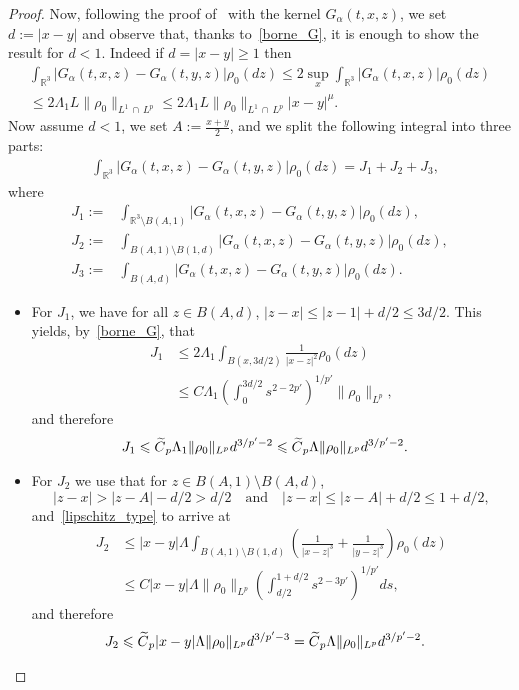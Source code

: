 \documentclass[AHL,Unicode,longabstracts,published]{cedram}
\newcommand{\R}{\mathbb{R}}
\renewcommand{\leq}{\leqslant}
\renewcommand{\geq}{\geqslant}
\let\oldtilde\tilde
\renewcommand*{\tilde}[1]{\mathchoice{\widetilde{#1}}{\widetilde{#1}}{\oldtilde{#1}}{\oldtilde{#1}}}
\begin{document}
\begin{proof}
Now, following the proof of~\cite[Lemma~2]{Miot} with the kernel $G_\alpha(t,x,z)$, we set $d:=|x-y|$ and observe that, thanks to~\eqref{borne_G}, it is enough to show the result for $d<1 $. Indeed if $d=|x-y|\geq 1$ then
\begin{multline}\label{eq:Holder_d>1}
\int_{\R^3} |G_\alpha(t,x,z)-G_\alpha(t,y,z)|\rho_0(dz)\leq 2 \underset{x}{\sup}\int_{\R^3} |G_\alpha(t,x,z)|\rho_0(dz) \\
\leq 2\Lambda_1 L \|\rho_0\|_{L^1\,\cap\,L^p} \leq 2\Lambda_1 L \|\rho_0\|_{L^1\,\cap\,L^p} |x-y|^\mu.
\end{multline}
Now assume $d<1$, we set $A:=\frac{x+y}{2}$, and we split the following integral into three parts:
\begin{align}\label{trich}
&\int_{\R^3} |G_\alpha(t,x,z)-G_\alpha(t,y,z)|\rho_0(dz) =J_1 +J_2+ J_3,
\end{align}
where
\begin{align*}
J_1 :=&\int_{\R^3\setminus B(A,1)}|G_\alpha(t,x,z)-G_\alpha(t,y,z)|\rho_0(dz),
\\ J_2 :=&\int_{B(A,1)\setminus B(1,d)}|G_\alpha(t,x,z)-G_\alpha(t,y,z)|\rho_0(dz),
\\ J_3 :=& \int_{B(A,d)}|G_\alpha(t,x,z)-G_\alpha(t,y,z)|\rho_0(dz).
\end{align*}
\begin{itemize}
\item For $J_1$, we have for all $z\in B(A,d)$, $|z-x|\leq |z-1|+d/2 \leq 3d/2$. This yields, by~\eqref{borne_G}, that
\begin{align*}
J_1&\leq 2 \Lambda_1 \int_{B(x,3d/2)} \frac{1}{|x-z|^2}\rho_0(dz)\\
&\leq C\Lambda_1 \left(\int_0^{3d/2} s^{2-2p'} \right)^{1/{p'}} \|\rho_0\|_{L^p},
\end{align*}
and therefore
\begin{align}\label{J1}
J_1 &\leq \tilde{C}_p \Lambda_1 \|\rho_0\|_{L^p} d^{3/{p'}-2}\leq \tilde{C}_p \Lambda \|\rho_0\|_{L^p} d^{3/{p'}-2}.
\end{align}
\item For $J_2$ we use that for $ z\in B(A,1)\setminus B(A,d)$,
\[
|z-x|>|z-A|-d/2>d/2
\quad\text{and}\quad |z-x|\leq |z-A|+d/2 \leq 1+d/2,
\]
and~\eqref{lipschitz_type} to arrive at
\begin{align*}
J_2&\leq |x-y|\Lambda \int_{ B(A,1)\setminus B(1,d)}\left(\frac{1 }{|x-z|^3}+\frac{1}{|y-z|^3} \right)\rho_0(dz)\\
&\leq C |x-y|\Lambda \|\rho_0\|_{L^p} \left(\int_{d/2}^{1+d/2} s^{2-3p'}\right)^{1/{p'}} ds,
\end{align*}
and therefore
\begin{align}\label{J2}
J_2&\leq \tilde{C}_p |x-y|\Lambda \|\rho_0\|_{L^p}d^{3/{p'}-3}=\tilde{C}_p \Lambda \|\rho_0\|_{L^p}d^{3/{p'}-2}.
\end{align}


\end{itemize}
\end{proof}
\end{document}
